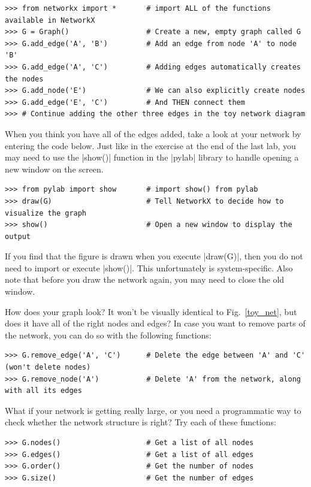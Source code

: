 \documentclass{article}
\begin{document}
\begin{Verbatim}[samepage=true]
>>> from networkx import *       # import ALL of the functions available in NetworkX
>>> G = Graph()                  # Create a new, empty graph called G
>>> G.add_edge('A', 'B')         # Add an edge from node 'A' to node 'B'
>>> G.add_edge('A', 'C')         # Adding edges automatically creates the nodes
>>> G.add_node('E')              # We can also explicitly create nodes
>>> G.add_edge('E', 'C')         # And THEN connect them
>>> # Continue adding the other three edges in the toy network diagram
\end{Verbatim}

When you think you have all of the edges added, take a look at your network by entering the code below.  Just like in the exercise at the end of the last lab, you may need to use the |show()| function in the |pylab| library to handle opening a new window on the screen.

\begin{Verbatim}[samepage=true]
>>> from pylab import show       # import show() from pylab
>>> draw(G)                      # Tell NetworkX to decide how to visualize the graph
>>> show()                       # Open a new window to display the output
\end{Verbatim}

If you find that the figure is drawn when you execute |draw(G)|, then you do not need to import or execute |show()|.  This unfortunately is system-specific. Also note that before you draw the network again, you may need to close the old window.

How does your graph look?  It won't be visually identical to Fig.~\ref{toy_net}, but does it have all of the right nodes 
and edges? In case you want to remove parts of the network, you can do so with the following functions:

\begin{Verbatim}[samepage=true]
>>> G.remove_edge('A', 'C')      # Delete the edge between 'A' and 'C' (won't delete nodes)
>>> G.remove_node('A')           # Delete 'A' from the network, along with all its edges
\end{Verbatim}
\pagebreak
What if your network is getting really large, or you need a programmatic way to check whether the network structure is right?  
Try each of these functions:

\begin{Verbatim}[samepage=true]
>>> G.nodes()                    # Get a list of all nodes
>>> G.edges()                    # Get a list of all edges
>>> G.order()                    # Get the number of nodes
>>> G.size()                     # Get the number of edges
\end{Verbatim}
\end{document}
